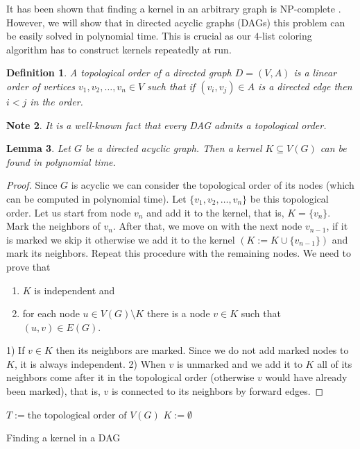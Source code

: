 \documentclass[a4paper, 12pt]{article}
\newtheorem{lem}{Lemma}[section]
\newtheorem{defin}[lem]{Definition}
\newtheorem{note}[lem]{Note}
\begin{document}
It has been shown that finding a kernel in an arbitrary graph is $\mathrm{NP}$-complete \cite{chvatal}. However, we will show that in directed acyclic graphs (DAGs) this problem can be easily solved in polynomial time. This is crucial as our $4$-list coloring algorithm has to construct kernels repeatedly at run.

\begin{defin} A topological order of a directed graph $D=(V,A)$ is a linear order of vertices $v_1,v_2,\ldots,v_n \in V$ such that if $(v_i,v_j) \in A$ is a directed edge then $i < j$ in the order.
\end{defin}

\begin{note} It is a well-known fact that every DAG admits a topological order.
\end{note}

\begin{lem}\label{lem:kernel-lemma} Let $G$ be a directed acyclic graph. Then a kernel $K \subseteq V(G)$ can be found in polynomial time.
\end{lem}
\begin{proof} Since $G$ is acyclic we can consider the topological order of its nodes (which can be computed in polynomial time). Let $\lbrace v_1, v_2, \ldots, v_n \rbrace$ be this topological order. Let us start from node $v_n$ and add it to the kernel, that is, $K = \lbrace v_n \rbrace$. Mark the neighbors of $v_n$. After that, we move on with the next node $v_{n-1}$, if it is marked we skip it otherwise we add it to the kernel $(K := K \cup \lbrace v_{n-1} \rbrace)$ and mark its neighbors. Repeat this procedure with the remaining nodes. We need to prove that
\begin{enumerate}
\item $K$ is independent and
\item for each node $u \in V(G) \setminus K$ there is a node $v \in K$ such that $(u,v) \in E(G)$.
\end{enumerate}
1) If $v \in K$ then its neighbors are marked. Since we do not add marked nodes to $K$, it is always independent.
2) When $v$ is unmarked and we add it to $K$ all of its neighbors come after it in the topological order (otherwise $v$ would have already been marked), that is, $v$ is connected to its neighbors by forward edges.
\end{proof}
\begin{algorithm}[h!]\label{alg:find-kernel-in-dags}
 $T := \text{the topological order of $V(G)$}$\;
 $K := \emptyset$\;
 \caption{Finding a kernel in a DAG}
\end{algorithm}
\end{document}
